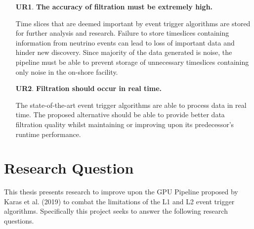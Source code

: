 \begin{enumerate}
  \item[\textbf{UR1}.]\textbf{The accuracy of filtration must be extremely high.}

    Time slices that are deemed important by event trigger algorithms
    are stored for further analysis and research. Failure to store
    timeslices containing information from neutrino events can lead to
    loss of important data and hinder new discovery. Since majority of
    the data generated is noise, the pipeline must be able to prevent
    storage of unnecessary timeslices containing only noise in the
    on-shore facility.

  \item[\textbf{UR2}.] \textbf{Filtration should occur in real time.}

    The state-of-the-art event trigger algorithms are able to process
    data in real time. The proposed alternative should be able to
    provide better data filtration quality whilst maintaining or
    improving upon its predecessor's runtime performance.

\end{enumerate}

\section{Research Question}
\label{sec:rqs}

This thesis presents research to improve upon the GPU Pipeline
proposed by Karas et al. (2019) to combat the limitations of the L1
and L2 event trigger algorithms. Specifically this project seeks to
answer the following research questions.

